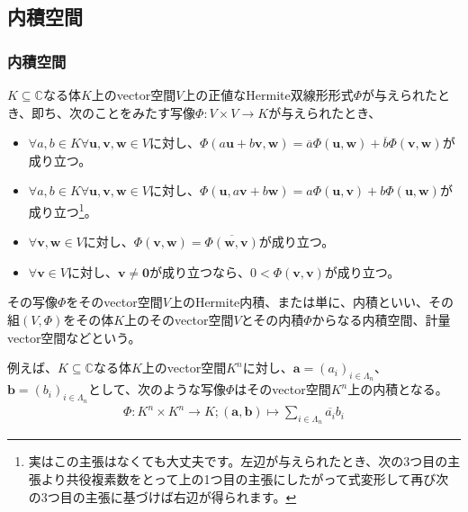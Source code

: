 \documentclass[dvipdfmx]{jsarticle}
\begin{document}
\subsection{内積空間}%
\subsubsection{内積空間}%
\begin{axs}[内積空間の公理]
$K \subseteq \mathbb{C}$なる体$K$上のvector空間$V$上の正値なHermite双線形形式$\varPhi$が与えられたとき、即ち、次のことをみたす写像$\varPhi :V\times V\to K$が与えられたとき、
\begin{itemize}
\item
  $\forall a,b \in K\forall\mathbf{u},\mathbf{v},\mathbf{w} \in V$に対し、$\varPhi\left( a\mathbf{u} + b\mathbf{v},\mathbf{w} \right) = \overline{a}\varPhi\left( \mathbf{u},\mathbf{w} \right) + \overline{b}\varPhi\left( \mathbf{v},\mathbf{w} \right)$が成り立つ。
\item
  $\forall a,b \in K\forall\mathbf{u},\mathbf{v},\mathbf{w} \in V$に対し、$\varPhi\left( \mathbf{u},a\mathbf{v} + b\mathbf{w} \right) = a\varPhi\left( \mathbf{u},\mathbf{v} \right) + b\varPhi\left( \mathbf{u},\mathbf{w} \right)$が成り立つ\footnote{実はこの主張はなくても大丈夫です。左辺が与えられたとき、次の3つ目の主張より共役複素数をとって上の1つ目の主張にしたがって式変形して再び次の3つ目の主張に基づけば右辺が得られます。}。
\item
  $\forall\mathbf{v},\mathbf{w} \in V$に対し、$\varPhi\left( \mathbf{v},\mathbf{w} \right) = \overline{\varPhi\left( \mathbf{w},\mathbf{v} \right)}$が成り立つ。
\item
  $\forall\mathbf{v} \in V$に対し、$\mathbf{v} \neq \mathbf{0}$が成り立つなら、$0 < \varPhi\left( \mathbf{v},\mathbf{v} \right)$が成り立つ。
\end{itemize}
その写像$\varPhi$をそのvector空間$V$上のHermite内積、または単に、内積といい、その組$(V,\varPhi)$をその体$K$上のそのvector空間$V$とその内積$\varPhi$からなる内積空間、計量vector空間などという。
\end{axs}\par
例えば、$K \subseteq \mathbb{C}$なる体$K$上のvector空間$K^{n}$に対し、$\mathbf{a} = \left( a_{i} \right)_{i \in \varLambda_{n}}$、$\mathbf{b} = \left( b_{i} \right)_{i \in \varLambda_{n}}$として、次のような写像$\varPhi$はそのvector空間$K^{n}$上の内積となる。
\begin{align*}
\varPhi:K^{n} \times K^{n} \rightarrow K;\left( \mathbf{a},\mathbf{b} \right) \mapsto \sum_{i \in \varLambda_{n}} {\overline{a_{i}}b_{i}}
\end{align*}
\end{document}
